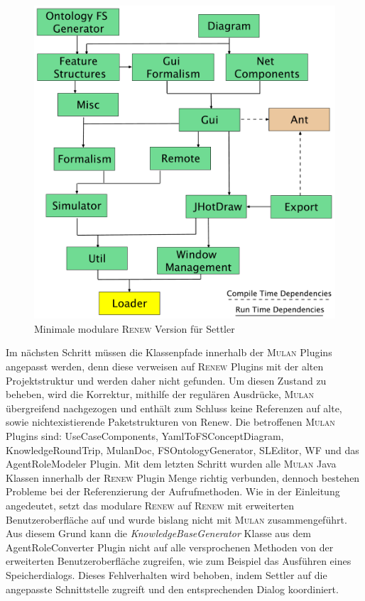 	\begin{figure}[h!]
	  \centering
	  \includegraphics[width=\textwidth]{material/images/settler-renew-tree-extend.pdf}
	  \caption{Minimale modulare \textsc{Renew} Version für Settler}
	  \label{fig:renew_mulan_plugins}
	\end{figure}	

	Im nächsten Schritt müssen die Klassenpfade innerhalb der \textsc{Mulan} Plugins angepasst werden, denn diese verweisen auf \textsc{Renew} Plugins mit der alten Projektstruktur und werden daher nicht gefunden. Um diesen Zustand zu beheben, wird die Korrektur, mithilfe der regulären Ausdrücke, \textsc{Mulan} übergreifend nachgezogen und enthält zum Schluss keine Referenzen auf alte, sowie nichtexistierende Paketstrukturen von Renew. Die betroffenen \textsc{Mulan} Plugins sind: UseCaseComponents, YamlToFSConceptDiagram, KnowledgeRoundTrip, MulanDoc, FSOntologyGenerator, SLEditor, WF und das AgentRoleModeler Plugin. \newline
	Mit dem letzten Schritt wurden alle \textsc{Mulan} Java Klassen innerhalb der \textsc{Renew} Plugin Menge richtig verbunden, dennoch bestehen Probleme bei der Referenzierung der Aufrufmethoden. Wie in der Einleitung angedeutet, setzt das modulare \textsc{Renew} auf \textsc{Renew} mit erweiterten Benutzeroberfläche auf und wurde bislang nicht mit \textsc{Mulan} zusammengeführt. Aus diesem Grund kann die \textit{KnowledgeBaseGenerator} Klasse aus dem AgentRoleConverter Plugin nicht auf alle versprochenen Methoden von der erweiterten Benutzeroberfläche zugreifen, wie zum Beispiel das Ausführen eines Speicherdialogs. Dieses Fehlverhalten wird behoben, indem Settler auf die angepasste Schnittstelle zugreift und den entsprechenden Dialog koordiniert. \bigbreak

